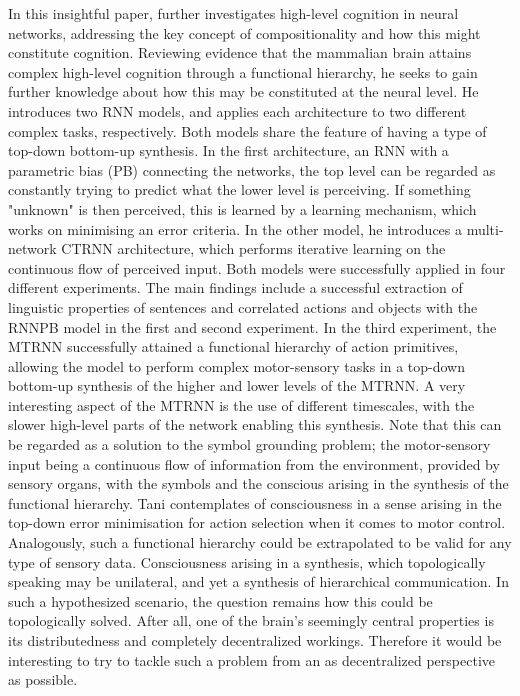 In this insightful paper, \cite{Tani2014} further investigates high-level cognition in neural networks, addressing the key concept of compositionality and how this might constitute cognition. Reviewing evidence that the mammalian brain attains complex high-level cognition through a functional hierarchy, he seeks to gain further knowledge about how this may be constituted at the neural level. He introduces two RNN models, and applies each architecture to two different complex tasks, respectively. Both models share the feature of having a type of top-down bottom-up synthesis. In the first architecture, an RNN with a parametric bias (PB) connecting the networks, the top level can be regarded as constantly trying to predict what the lower level is perceiving. If something "unknown" is then perceived, this is learned by a learning mechanism, which works on minimising an error criteria. In the other model, he introduces a multi-network CTRNN architecture, which performs iterative learning on the continuous flow of perceived input. Both models were successfully applied in four different experiments. The main findings include a successful extraction of linguistic properties of sentences and correlated actions and objects with the RNNPB model in the first and second experiment. In the third experiment, the MTRNN successfully attained a functional hierarchy of action primitives, allowing the model to perform complex motor-sensory tasks in a top-down bottom-up synthesis of the higher and lower levels of the MTRNN. A very interesting aspect of the MTRNN is the use of different timescales, with the slower high-level parts of the network enabling this synthesis. Note that this can be regarded as a solution to the symbol grounding problem; the motor-sensory input being a continuous flow of information from the environment, provided by sensory organs, with the symbols and the conscious arising in the synthesis of the functional hierarchy. Tani contemplates of consciousness in a sense arising in the top-down error minimisation for action selection when it comes to motor control. Analogously, such a functional hierarchy could be extrapolated to be valid for any type of sensory data. Consciousness arising in a synthesis, which topologically speaking may be unilateral, and yet a synthesis of hierarchical communication. In such a hypothesized scenario, the question remains how this could be topologically solved. After all, one of the brain's seemingly central properties is its distributedness and completely decentralized workings. Therefore it would be interesting to try to tackle such a problem from an as decentralized perspective as possible.
